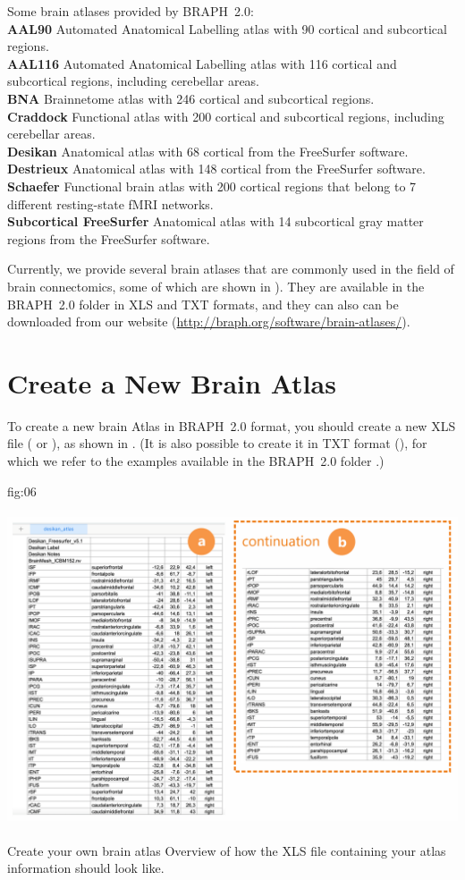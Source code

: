 \documentclass[justified]{tufte-handout}
\begin{document}
	{
	Some brain atlases provided by BRAPH~2.0: \\
	{\bf AAL90} Automated Anatomical Labelling atlas with 90 cortical and subcortical regions.\\
	{\bf AAL116} Automated Anatomical Labelling atlas with 116 cortical and subcortical regions, including cerebellar areas.\\
	{\bf BNA} Brainnetome atlas with 246 cortical and subcortical regions.\\
	{\bf Craddock} Functional atlas with 200 cortical and subcortical regions, including cerebellar areas.\\
	{\bf Desikan} Anatomical atlas with 68 cortical from the FreeSurfer software.\\
	{\bf Destrieux} Anatomical atlas with 148 cortical from the FreeSurfer software.\\
	{\bf Schaefer} Functional brain atlas with 200 cortical regions that belong to 7 different resting-state fMRI networks.\\
	{\bf Subcortical FreeSurfer} Anatomical atlas with 14 subcortical gray matter regions from the FreeSurfer software.
	}

Currently, we provide several brain atlases that are commonly used in the field of brain connectomics, some of which are shown in ). 
They are available in the BRAPH~2.0 folder  in XLS and TXT formats, and they can also can be downloaded from our website (\url{http://braph.org/software/brain-atlases/}).

\clearpage
\section{Create a New Brain Atlas}

To create a new brain Atlas in BRAPH~2.0 format, you should create a new XLS file ( or ), as shown in . 
(It is also possible to create it in TXT format (), for which we refer to the examples available in the BRAPH~2.0 folder .)

	{fig:06}
	{\includegraphics[height=10cm]{tut_ba/fig06.png}}
	{Create your own brain atlas}
	{
	Overview of how the XLS file containing your atlas information should look like.
	}
\end{document}
